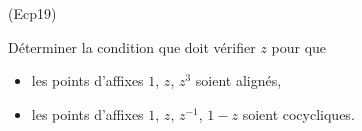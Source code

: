 \begin{tiny}(Ecp19)\end{tiny}
Déterminer la condition que doit vérifier $z$ pour que
\begin{itemize}
\item  les points d'affixes $1$, $z$, $z^{3}$ soient align{\'e}s,

\item  les points d'affixes $1$, $z$, $z^{-1}$, $1-z$ soient cocycliques.
\end{itemize}